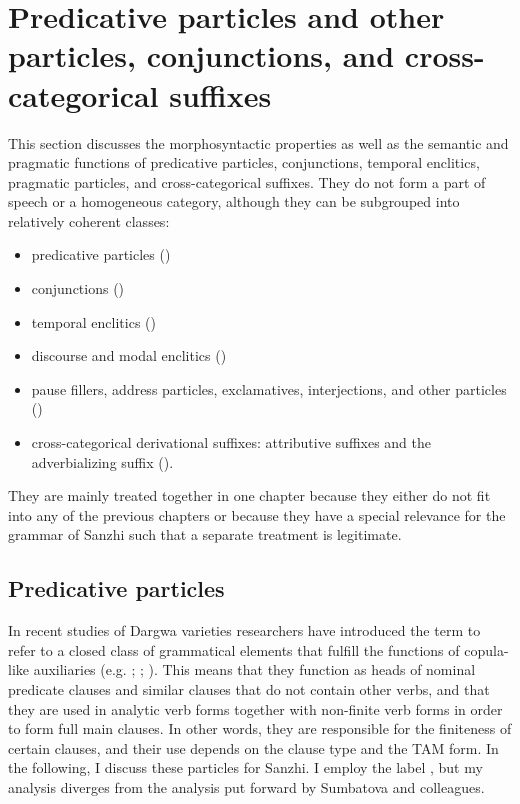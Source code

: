 \chapter{Predicative particles and other particles, conjunctions, and cross-categorical suffixes}
\label{cpt:Minor parts of speech}

This section discusses the morphosyntactic properties as well as the semantic and pragmatic functions of predicative particles, conjunctions, temporal enclitics, pragmatic particles, and cross-categorical suffixes. They do not form a part of speech or a homogeneous category, although they can be subgrouped into relatively coherent classes:
%
\begin{itemize}
	\item	predicative particles ()
	\item	conjunctions ()
	\item  temporal enclitics ()
	\item	discourse and modal enclitics ()
	\item	pause fillers, address particles, exclamatives, interjections, and other particles ()
	\item	cross-categorical derivational suffixes: attributive suffixes and the adverbializing suffix ().
\end{itemize}

They are mainly treated together in one chapter because they either do not fit into any of the previous chapters or because they have a special relevance for the grammar of Sanzhi such that a separate treatment is legitimate.

\section{Predicative particles}
\label{sec:Predicative particles}

In recent studies of Dargwa varieties researchers have introduced the term  to refer to a closed class of grammatical elements that fulfill the functions of copula-like auxiliaries (e.g. ; ; ). This means that they function as heads of nominal predicate clauses and similar clauses that do not contain other verbs, and that they are used in analytic verb forms together with non-finite verb forms in order to form full main clauses. In other words, they are responsible for the finiteness of certain clauses, and their use depends on the clause type and the TAM form. In the following, I discuss these particles for Sanzhi. I employ the label , but my analysis diverges from the analysis put forward by Sumbatova and colleagues.

